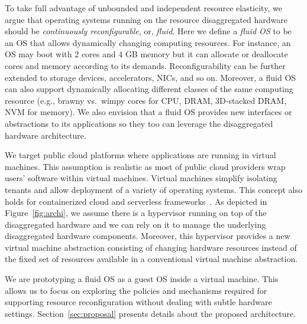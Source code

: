 To take full advantage of unbounded and independent resource
elasticity, we argue that operating systems running on the resource
disaggregated hardware should be \emph{continuously reconfigurable},
or, \emph{fluid}.
Here we define a \emph{fluid OS} to be an OS that allows
dynamically changing computing resources. For instance, an OS may
boot with 2 cores and 4 GB memory but it can allocate or deallocate
cores and memory according to its demands. Reconfigurability can
be further extended to storage devices, accelerators, NICs, and so
on.  Moreover, a fluid OS can also support dynamically
allocating different classes of the same computing resource (e.g.,
brawny vs.~wimpy cores for CPU, DRAM, 3D-stacked DRAM, NVM for
memory).
We also envision that a fluid OS provides new interfaces or
abstractions to its applications so they too can leverage the
disaggregated hardware architecture.

We target public cloud platforms where applications are
running in virtual machines. This assumption is realistic as most
of public cloud providers wrap users' software within virtual
machines.
Virtual machines simplify isolating tenants and allow
deployment of a variety of operating systems.
This concept also holds for containerized cloud and
serverless frameworks~\cite{agache2020firecracker}. As depicted in
Figure~\ref{fig:archi}, we assume there is a hypervisor running on
top of the disaggregated hardware and we can rely on it to manage
the underlying disaggregated hardware components. Moreover, this
hypervisor provides a new virtual machine abstraction consisting
of changing hardware resources instead of the fixed set of resources
available in a conventional virtual machine abstraction.

We are prototyping a fluid OS as a guest OS inside
a virtual machine. This allows us to focus on exploring the policies
and mechanisms required for supporting resource reconfiguration
without dealing with subtle hardware settings.
Section~\ref{sec:proposal} presents details about the
proposed architecture.

